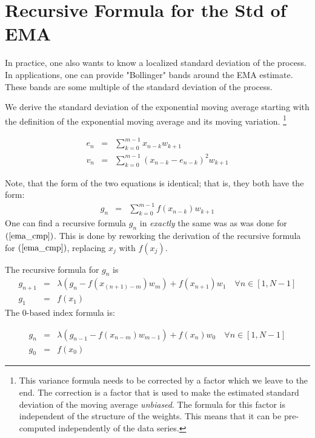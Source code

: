 \documentclass{article}
\begin{document}
\section{Recursive Formula for the Std of EMA}
In practice, one also wants to know a localized standard deviation of the process.
In applications, one can provide "Bollinger" bands around the EMA estimate.
These bands are some multiple of the standard deviation of the process.

We derive the standard deviation of the exponential moving average starting
with the definition of the exponential moving average and its moving variation.%
\footnote{This variance formula needs to be corrected by a factor which we 
leave to the end. The correction is a factor that is used to make the 
estimated standard deviation of the moving average {\em unbiased\/}.
The formula for this factor is independent of the structure of the weights.
This means that it can be pre-computed independently of the data series.}

\begin{eqnarray}
    e_n & = & \sum_{k=0}^{m-1} x_{n-k} w_{k+1} \label{ema_cmp} \\
    v_n & = & \sum_{k=0}^{m-1} (x_{n-k} - e_{n-k})^2 w_{k+1}  \label{var} 
\end{eqnarray}

Note, that the form of the two equations is identical; that is, 
they both have the form:
\begin{eqnarray}
    g_n & = & \sum_{k=0}^{m-1} f(x_{n-k}) w_{k+1}
\end{eqnarray}
One can find a recursive formula $g_n$ in {\em exactly\/} the same was as
was done for $(\ref{ema_cmp})$. This is done by reworking the derivation of 
the recursive formula for $(\ref{ema_cmp})$, replacing $x_j$ with $f(x_j)$.

The recursive formula for $g_n$ is
\begin{eqnarray}
    g_{n+1} & = & \lambda \left( g_{n} - f(x_{(n+1)-m}) w_m \right) + f(x_{n+1}) w_1  \quad \forall n \in [1, N-1] \\
    g_1 & = & f(x_1)
\end{eqnarray}
The 0-based index formula is:

\begin{eqnarray}
    g_{n} & = & \lambda \left( g_{n-1} - f(x_{n-m}) w_{m-1} \right) + f(x_{n}) w_0  \quad \forall n \in [1, N-1] \\
    g_0 & = & f(x_0)
\end{eqnarray}
\end{document}
